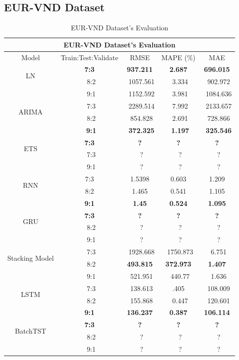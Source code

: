 \documentclass{ieeeojies}
\begin{document}
\subsection{EUR-VND Dataset} 
\begin{table}[H]
    \centering
    \begin{tabular}{|c|c|c|c|c|}
         \hline
         \multicolumn{5}{|c|}{\textbf{EUR-VND Dataset's Evaluation}}\\
         \hline
         \centering Model & Train:Test:Validate & RMSE & MAPE (\%) & MAE\\
         \hline
         \multirow{2}{*}{LN} &\textbf{7:3} &\textbf{937.211} &\textbf{2.687} &\textbf{696.015} \\ &\ 8:2 &\ 1057.561 &\ 3.334 &\ 902.972 \\&\ 9:1 &\ 1152.592 &\ 3.981 &\ 1084.636 \\
         \hline
         \multirow{2}{*}{ARIMA} &\ 7:3 &\ 2289.514 &\ 7.992 &\ 2133.657 \\ &\ 8:2 &\ 854.828 &\ 2.691 &\ 728.866 \\&\ \textbf{9:1} &\ \textbf{372.325} &\ \textbf{1.197} &\ \textbf{325.546} \\
         \hline
         \multirow{2}{*}{ETS} &\textbf{7:3} &\textbf{?}&\textbf{?}&\textbf{?} \\ &\ 7:3 &\ ?&\ ? &\ ? \\&\ 9:1 &\ ? &\ ? &\ ? \\
         \hline
         \multirow{2}{*}{RNN} & 7:3 & 1.5398 & 0.603 & 1.209 \\ & 8:2 & 1.465 & 0.541 & 1.105 \\& \textbf{9:1} & \textbf{1.45} & \textbf{0.524} & \textbf{1.095} \\
         \hline
         \multirow{2}{*}{GRU} &\textbf{7:3} &\textbf{?}&\textbf{?}&\textbf{?} \\ &\ 8:2 &\ ?&\ ? &\ ? \\&\ 9:1 &\ ? &\ ? &\ ? \\
         \hline
         \multirow{2}{*}{Stacking Model} &\ 7:3 &\ 1928.668 &\ 1750.873 &\ 6.751 \\ &\ 8:2 &\textbf{493.815} &\textbf{372.973} &\textbf{1.407}\\&\ 9:1 &\ 521.951 &\ 440.77 &\ 1.636 \\
         \hline
         \multirow{2}{*}{LSTM} &\ 7:3 &\ 138.613 &\0.405 &\ 108.009 \\ &\ 8:2 &\ 155.868&\ 0.447 &\ 120.601 \\&\textbf{9:1}&\textbf{136.237} &\textbf{0.387} &\textbf{106.114} \\
         \hline
         \multirow{2}{*}{BatchTST} &\textbf{7:3} &\textbf{?}&\textbf{?}&\textbf{?} \\ &\ 8:2 &\ ?&\ ? &\ ? \\&\ 9:1 &\ ? &\ ? &\ ? \\
         \hline
    \end{tabular}
    \caption{EUR-VND Dataset's Evaluation}
    \label{vcbresult}
\end{table}
\end{document}
